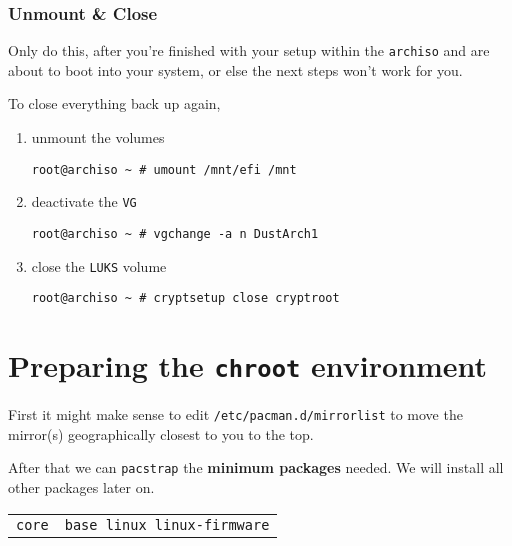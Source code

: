 \documentclass[9pt]{report}
\newenvironment{WARNING}
{\begin{tcolorbox}[colback=admonitionBG,coltitle=draculaBG,colframe=draculaOrange,colbacktitle=draculaOrange,title=WARNING]}
{\end{tcolorbox}}
\newenvironment{packagetable}
{\begin{longtabu}to \textwidth [b]{X[1,r]|X[1,l]}}
{\end{longtabu}}
\begin{document}
\newpage

\hypertarget{x-unmount-and-close}{\subsubsection{Unmount \& Close}}
\begin{WARNING}
    Only do this, after you’re finished with your setup within the \texttt{archiso} and are about to boot into your system, or else the next steps won’t work for you.

\end{WARNING}
To close everything back up again,


\begin{enumerate}

    \item{unmount the volumes}

        \begin{verbatim}
root@archiso ~ # umount /mnt/efi /mnt
        \end{verbatim}
    \item{deactivate the \texttt{VG}}

        \begin{verbatim}
root@archiso ~ # vgchange -a n DustArch1
        \end{verbatim}
    \item{close the \texttt{LUKS} volume}

        \begin{verbatim}
root@archiso ~ # cryptsetup close cryptroot
        \end{verbatim}
\end{enumerate}



\newpage

\hypertarget{x-preparing-the-chroot-environment}{\section{Preparing the \texttt{chroot} environment}}
First it might make sense to edit \texttt{/etc/pacman.d/mirrorlist} to move the mirror(s) geographically closest to you to the top.


After that we can \texttt{pacstrap} the \textbf{minimum packages} needed.
We will install all other packages later on.


\begin{packagetable}
    \texttt{core} & \texttt{base linux linux-firmware} \\ 
\end{packagetable}
\end{document}
